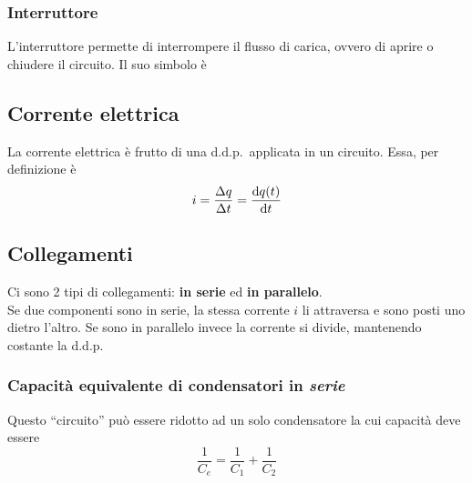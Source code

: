\subsubsection{Interruttore}
L'interruttore permette di interrompere il flusso di carica, ovvero di aprire o chiudere il 
circuito. Il suo simbolo è
\begin{center}
\end{center}


\subsection{Corrente elettrica}
La corrente elettrica è frutto di una d.d.p.\ applicata in un circuito. Essa, per definizione è
\begin{equation*}
  i = \frac{\Delta q}{\Delta t} = \frac{\mathop{}\!\mathrm{d} q(t)}{\mathop{}\!\mathrm{d} t}
\end{equation*}

\subsection{Collegamenti}
Ci sono 2 tipi di collegamenti: \textbf{in serie} ed \textbf{in parallelo}.\\
Se due componenti sono in serie, la stessa corrente $i$ li attraversa e sono posti uno dietro 
l'altro. Se sono in parallelo invece la corrente si divide, mantenendo costante la d.d.p.

\subsubsection{Capacità equivalente di condensatori in \emph{serie}}
\begin{center}
\end{center}
Questo ``circuito'' può essere ridotto ad un solo condensatore la cui capacità deve essere
\begin{equation*}
  \frac{1}{C_e} = \frac{1}{C_1} + \frac{1}{C_2}
\end{equation*}

